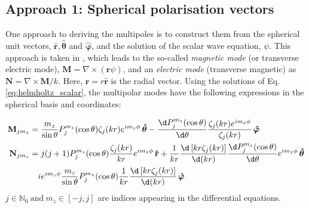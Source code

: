 \subsection{Approach 1: Spherical polarisation vectors}\label{sec:2_bohren}
One approach to deriving the multipoles is to construct them from the spherical unit vectors, $\mathbf{\hat{r}}, \boldsymbol{\hat{\theta}}$ and $\boldsymbol{\hat{\varphi}}$, and the solution of the scalar wave equation, $\psi$. This approach is taken in \cite{bohren}, which leads to the so-called \textit{magnetic mode} (or transverse electric mode), $\mathbf{M}=\nabla \times (\mathbf{r}\psi)$, and an \textit{electric mode} (transverse magnetic) as $\mathbf{N}=\nabla \times \mathbf{M}/k$. Here, $\mathbf{r}=r\hat{\mathbf{r}}$ is the radial vector.
Using the solutions of Eq. \ref{eq:helmholtz_scalar}, the multipolar modes have the following expressions in the spherical basis and coordinates:

\begin{align*}
\mathbf{M}_{jm_z} &= \frac{m_z}{\sin \theta} P_j^{m_z}(\cos\theta) \zeta_j(kr) e^{im_z \phi} \, \boldsymbol{\hat{\theta}} - \frac{\d P_j^{m_z}(\cos\theta)}{\d \theta} \frac{\zeta_j(kr) e^{im_z \phi}}{\zeta_j(kr)} \,\boldsymbol{\hat{\varphi}} \\
\mathbf{N}_{jm_z} &=  j(j + 1) P_j^{m_z}(\cos\theta) \frac{\zeta_j(kr)}{kr} e^{im_z \phi} \, \mathbf{\hat{r}} + \frac{1}{kr} \frac{\d \left[ kr \zeta_j(kr) \right]}{\d (kr)} \frac{\d P_j^{m_z}(\cos\theta)}{\d \theta} e^{im_z \phi} \, \boldsymbol{\hat{\theta}} \\
&\quad i e^{im_z \phi} \frac{m_z}{\sin \theta} P_j^{m_z}(\cos\theta) \frac{1}{kr} \frac{\d \left[ kr \zeta_j(kr) \right]}{\d (kr)} \, \boldsymbol{\hat{\varphi}} 
\end{align*}
$j\in\mathbb{N}_0\ \text{and}\ m_z\in [-j,j]$ are indices appearing in the differential equations.


